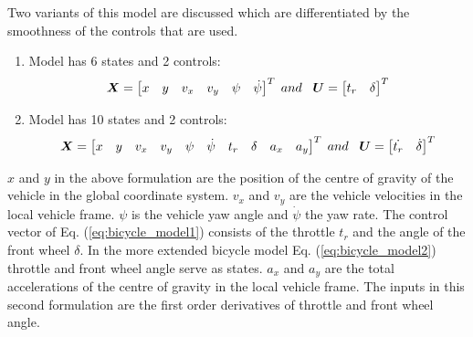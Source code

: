 Two variants of this model are discussed which are differentiated by the smoothness of the controls that are used. 
\begin{enumerate}
	\item	Model has 6 states and 2 controls: 
	\begin{equation}\label{eq:bicycle_model1}
	\centering
	\bm{X} = 
	\begin{bmatrix}
	x & y & v_x & v_y & \psi & \dot{\psi}
	\end{bmatrix}^{T}
	\; and \hspace{2mm} \; \bm{U} = 
	\begin{bmatrix}
	t_r & \delta
	\end{bmatrix}^{T}
	\end{equation}
	
	\item Model has 10 states and 2 controls:
	\begin{equation}\label{eq:bicycle_model2}
	\centering
	\bm{X} = 
	\begin{bmatrix}
	x & y & v_x & v_y & \psi & \dot{\psi} & t_r & \delta & a_x & a_y
	\end{bmatrix}^{T}
	\; and \hspace{2mm} \; \bm{U} = 
	\begin{bmatrix}
	\dot{t_r} & \dot{\delta}
	\end{bmatrix}^{T}
	\end{equation}
\end{enumerate}


$x$ and $y$ in the above formulation are the position of the centre of gravity of the vehicle in the global coordinate system. $v_x$ and $v_y$ are the vehicle velocities in the local vehicle frame. $\psi$ is the vehicle yaw angle and $\dot{\psi}$ the yaw rate. The control vector of Eq. (\ref{eq:bicycle_model1}) consists of the throttle $t_r$ and the angle of the front wheel $\delta$. In the more extended bicycle model Eq. (\ref{eq:bicycle_model2}) throttle and front wheel angle serve as states. $a_x$ and $a_y$ are the total accelerations of the centre of gravity in the local vehicle frame. The inputs in this second formulation are the first order derivatives of throttle and front wheel angle.\\


